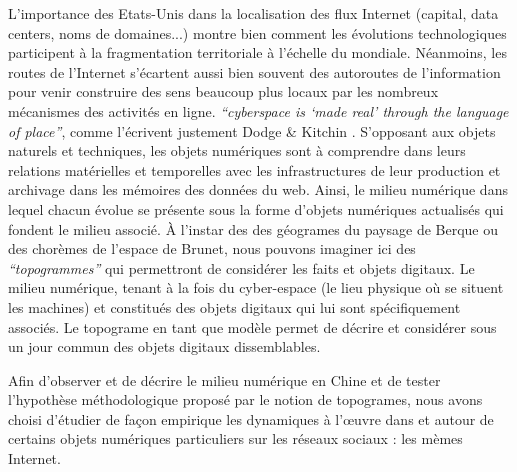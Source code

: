 L’importance des Etats-Unis \citep{Zook2001, Cukier1999} dans la localisation des flux Internet (capital, data centers, noms de domaines...) montre bien comment les évolutions technologiques participent à la fragmentation territoriale à l’échelle du mondiale. Néanmoins, les routes de l’Internet s’écartent aussi bien souvent des autoroutes de l’information pour venir construire des sens beaucoup plus locaux par les nombreux mécanismes des activités en ligne. \textit{“cyberspace is ‘made real’ through the language of place”}, comme l’écrivent justement Dodge \& Kitchin \citep{Dodge2007}.
S’opposant aux objets naturels et techniques, les objets numériques sont à comprendre dans leurs relations matérielles et temporelles avec les infrastructures de leur production et archivage dans les mémoires des données du web. Ainsi, le milieu numérique dans lequel chacun évolue se présente sous la forme d’objets numériques actualisés qui fondent le milieu associé. À l’instar des des géogrames du paysage de Berque ou des chorèmes de l’espace de Brunet, nous pouvons imaginer ici des \textit{“topogrammes”} qui permettront de considérer les faits et objets digitaux. Le milieu numérique, tenant à la fois du cyber-espace (le lieu physique où se situent les machines) et constitués des objets digitaux qui lui sont spécifiquement associés. Le topograme en tant que modèle permet de décrire et considérer sous un jour commun des objets digitaux dissemblables.

Afin d’observer et de décrire le milieu numérique en Chine et de tester l’hypothèse méthodologique proposé par le notion de topogrames, nous avons choisi d’étudier de façon empirique les dynamiques à l’œuvre dans et autour de certains objets numériques particuliers sur les réseaux sociaux : les mèmes Internet. 
